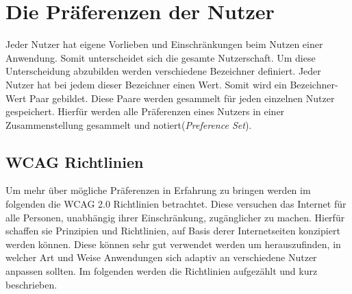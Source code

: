 \documentclass[12pt, paper=a4, bibtotoc, toc=listof, headsepline=true]{scrreprt}
\begin{document}
	\section{Die Präferenzen der Nutzer}
	Jeder Nutzer hat eigene Vorlieben und Einschränkungen beim Nutzen einer Anwendung. Somit unterscheidet sich die gesamte Nutzerschaft. Um diese Unterscheidung abzubilden werden verschiedene Bezeichner definiert. Jeder Nutzer hat bei jedem dieser Bezeichner einen Wert. Somit wird ein Bezeichner-Wert Paar gebildet. Diese Paare werden gesammelt für jeden einzelnen Nutzer gespeichert. Hierfür werden alle Präferenzen eines Nutzers in einer Zusammenstellung gesammelt und notiert(\emph{Preference Set}).
		\subsection{WCAG Richtlinien}
		Um mehr über mögliche Präferenzen in Erfahrung zu bringen werden im folgenden die \ac{WCAG 2.0} Richtlinien betrachtet. Diese versuchen das Internet für alle Personen, unabhängig ihrer Einschränkung, zugänglicher zu machen. Hierfür schaffen sie Prinzipien und Richtlinien, auf Basis derer Internetseiten konzipiert werden können. Diese können sehr gut verwendet werden um herauszufinden, in welcher Art und Weise Anwendungen sich adaptiv an verschiedene Nutzer anpassen sollten. Im folgenden werden die Richtlinien aufgezählt und kurz beschrieben.\cite[vgl.]{wcag}
\end{document}
